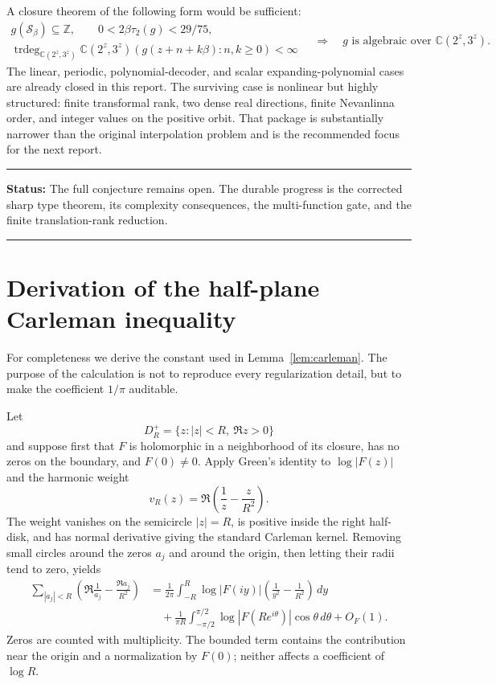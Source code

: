 \documentclass[11pt,oneside]{article}
\theoremstyle{definition}
\theoremstyle{remark}
\newcommand{\Z}{\mathbb Z}
\newcommand{\C}{\mathbb C}
\newcommand{\Sbeta}{\mathcal S_\beta}
\newcommand{\trdeg}{\operatorname{trdeg}}
\newenvironment{statusbox}[1]
{\begin{center}\begin{minipage}{0.94\textwidth}\raggedright\hrule\vspace{0.45em}\textbf{Status:} #1\par\vspace{0.35em}}
{\vspace{0.35em}\hrule\end{minipage}\end{center}}
\begin{document}
A closure theorem of the following form would be sufficient:
\[
 \begin{gathered}
 g(\Sbeta)\subseteq\Z,\qquad
 0<2\beta\tau_2(g)<29/75,\\
 \trdeg_{\C(2^z,3^z)}
 \C(2^z,3^z)(g(z+n+k\beta):n,k\ge0)<\infty
 \end{gathered}
 \quad\Longrightarrow\quad
 g\text{ is algebraic over }\C(2^z,3^z).
\]
The linear, periodic, polynomial-decoder, and scalar expanding-polynomial cases are already
closed in this report.  The surviving case is nonlinear but highly structured: finite
transformal rank, two dense real directions, finite Nevanlinna order, and integer values on
the positive orbit.  That package is substantially narrower than the original interpolation
problem and is the recommended focus for the next report.

\begin{statusbox}{The full conjecture remains open.  The durable progress is the corrected
sharp type theorem, its complexity consequences, the multi-function gate, and the finite
translation-rank reduction.}
\end{statusbox}

\appendix

\section{Derivation of the half-plane Carleman inequality}
\label{app:carleman}

For completeness we derive the constant used in Lemma~\ref{lem:carleman}.  The purpose of
the calculation is not to reproduce every regularization detail, but to make the coefficient
$1/\pi$ auditable.

Let
\[
 D_R^+=\{z:|z|<R,\ \Re z>0\}
\]
and suppose first that $F$ is holomorphic in a neighborhood of its closure, has no zeros on
the boundary, and $F(0)\ne0$.  Apply Green's identity to $\log|F(z)|$ and the harmonic
weight
\[
 v_R(z)=\Re\left(\frac1z-\frac z{R^2}\right).
\]
The weight vanishes on the semicircle $|z|=R$, is positive inside the right half-disk, and
has normal derivative giving the standard Carleman kernel.  Removing small circles around
the zeros $a_j$ and around the origin, then letting their radii tend to zero, yields
\begin{align}
 \sum_{|a_j|<R}
 \left(\Re\frac1{a_j}-\frac{\Re a_j}{R^2}\right)
 &=\frac1{2\pi}\int_{-R}^{R}
   \log|F(iy)|\left(\frac1{y^2}-\frac1{R^2}\right)\,dy
 \label{eq:fullcarleman}\\
 &\quad+\frac1{\pi R}\int_{-\pi/2}^{\pi/2}
   \log|F(Re^{i\theta})|\cos\theta\,d\theta
 +O_F(1).
 \nonumber
\end{align}
Zeros are counted with multiplicity.  The bounded term contains the contribution near the
origin and a normalization by $F(0)$; neither affects a coefficient of $\log R$.
\end{document}
